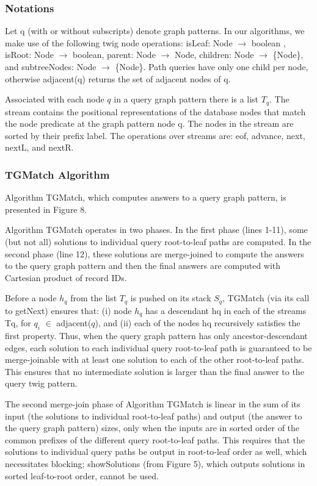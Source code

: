 \documentclass{sig-alternate}
\begin{document}
\subsubsection{Notations}

Let q (with or without subscripts) denote graph patterns.
In our algorithms, we make use of the following twig node
operations: isLeaf: Node $\rightarrow$ boolean , isRoot: Node $\rightarrow$  boolean,
parent: Node $\rightarrow$ Node, children: Node $\rightarrow$ \{Node\}, and
subtreeNodes: Node $\rightarrow$ \{Node\}. Path queries have only
one child per node, otherwise adjacent(q) returns the set
of adjacent nodes of q.

Associated with each node $q$ in a query graph pattern there
is a list $T_q$. The stream contains the positional representations
of the database nodes that match the node predicate
at the graph pattern node q. The
nodes in the stream are sorted by their prefix label. The operations over streams are: eof, advance,
next, nextL, and nextR.

\subsubsection{TGMatch Algorithm}

Algorithm TGMatch, which computes answers to a query
graph pattern, is presented in Figure 8.

Algorithm TGMatch operates in two phases. In the first
phase (lines 1-11), some (but not all) solutions to individual
query root-to-leaf paths are computed. In the second phase
(line 12), these solutions are merge-joined to compute the
answers to the query graph pattern and then the final answers are computed with Cartesian product of record IDs.

 Before a node $h_q$ from the list $T_q$ is
pushed on its stack $S_q$, TGMatch (via its call to getNext)
ensures that: (i) node $h_q$ has a descendant hq in each
of the streams Tq, for $q_i$ $\in$ adjacent($q$), and (ii) each of
the nodes hq recursively satisfies the first property.  Thus, when the query graph pattern has only
ancestor-descendant edges, each solution to each individual
query root-to-leaf path is guaranteed to be merge-joinable
with at least one solution to each of the other root-to-leaf
paths. This ensures that no intermediate solution is larger
than the final answer to the query twig pattern.

The second merge-join phase of Algorithm TGMatch is
linear in the sum of its input (the solutions to individual
root-to-leaf paths) and output (the answer to the query graph
pattern) sizes, only when the inputs are in sorted order of the
common prefixes of the different query root-to-leaf paths.
This requires that the solutions to individual query paths
be output in root-to-leaf order as well, which necessitates
blocking; showSolutions (from Figure 5), which outputs
solutions in sorted leaf-to-root order, cannot be used.
\end{document}
